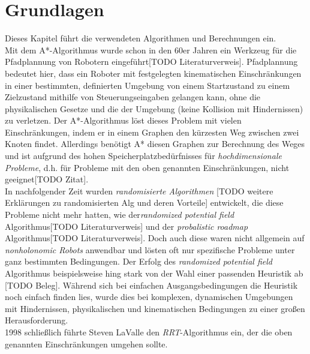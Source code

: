 \section{Grundlagen}
Dieses Kapitel führt die verwendeten Algorithmen und Berechnungen ein.\\
Mit dem A*-Algorithmus wurde schon in den 60er Jahren ein Werkzeug für die Pfadplannung von Robotern eingeführt[TODO Literaturverweis]. Pfadplannung bedeutet hier, dass ein Roboter mit festgelegten kinematischen Einschränkungen in einer bestimmten, definierten Umgebung von einem Startzustand zu einem Zielzustand mithilfe von Steuerungseingaben gelangen kann, ohne die physikalischen Gesetze und die der Umgebung (keine Kollision mit Hindernissen) zu verletzen. Der A*-Algorithmus löst dieses Problem mit vielen Einschränkungen, indem er in einem Graphen den kürzesten Weg zwischen zwei Knoten findet. Allerdings benötigt A* diesen Graphen zur Berechnung des Weges und ist aufgrund des hohen Speicherplatzbedürfnisses für \textit{hochdimensionale Probleme}, d.h. für Probleme mit den oben genannten Einschränkungen, nicht geeignet[TODO Zitat].\\
In nachfolgender Zeit wurden \textit{randomisierte Algorithmen} [TODO weitere Erklärungen zu randomisierten Alg und deren Vorteile] entwickelt, die diese Probleme nicht mehr hatten, wie der\textit{randomized potential field} Algorithmus[TODO Literaturverweis] und der \textit{probalistic roadmap} Algorithmus[TODO Literaturverweis]. Doch auch diese waren nicht allgemein auf \textit{nonholonomic Robots} anwendbar und lösten oft nur spezifische Probleme unter ganz bestimmten Bedingungen. Der Erfolg des \textit{randomized potential field} Algorithmus beispielsweise hing stark von der Wahl einer passenden Heuristik ab [TODO Beleg]. Während sich bei einfachen Ausgangsbedingungen die Heuristik noch einfach finden lies, wurde dies bei komplexen, dynamischen Umgebungen mit Hindernissen, physikalischen und kinematischen Bedingungen zu einer großen Herausforderung. \\
1998 schließlich führte Steven LaValle den \textit{RRT}-Algorithmus ein, der die oben genannten Einschränkungen umgehen sollte.

